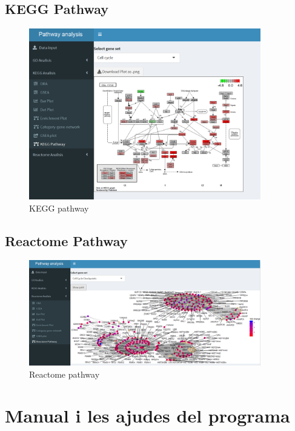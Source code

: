 \subsection{\gls{KEGG} Pathway}


\begin{figure}[H]
\centering
\includegraphics[width=0.9\textwidth]{figures/App_F20_Items_KEGG_KEGGPathway.png} 
\caption{\gls{KEGG} pathway}
\end{figure}

\subsection{Reactome Pathway}

\begin{figure}[H]
\centering
\includegraphics[width=0.9\textwidth]{figures/App_F21_Items_RA_RAPathway.png} 
\caption{Reactome pathway}
\end{figure}


\section{Manual i les ajudes del programa}

